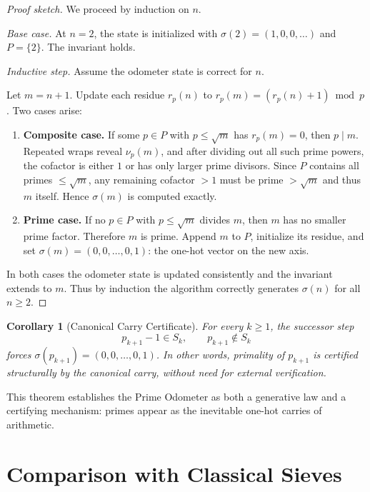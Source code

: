 \documentclass[12pt]{article}
\newtheorem{corollary}[theorem]{Corollary}
\theoremstyle{definition}
\theoremstyle{remark}
\begin{document}
\begin{proof}[Proof sketch]
We proceed by induction on $n$.

\emph{Base case.} At $n=2$, the state is initialized with $\sigma(2)=(1,0,0,\dots)$ and
$P=\{2\}$. The invariant holds.

\emph{Inductive step.} Assume the odometer state is correct for $n$.

Let $m=n+1$. Update each residue $r_p(n)$ to $r_p(m)=(r_p(n)+1)\bmod p$. Two cases arise:

\begin{enumerate}
  \item \textbf{Composite case.} If some $p \in P$ with $p \leq \sqrt{m}$ has $r_p(m)=0$, then
  $p \mid m$. Repeated wraps reveal $\nu_p(m)$, and after dividing out all such prime powers,
  the cofactor is either $1$ or has only larger prime divisors. Since $P$ contains all primes
  $\leq \sqrt{m}$, any remaining cofactor $>1$ must be prime $> \sqrt{m}$ and thus $m$ itself.
  Hence $\sigma(m)$ is computed exactly.

  \item \textbf{Prime case.} If no $p \in P$ with $p \leq \sqrt{m}$ divides $m$, then $m$ has
  no smaller prime factor. Therefore $m$ is prime. Append $m$ to $P$, initialize its residue,
  and set $\sigma(m)=(0,0,\dots,0,1)$: the one-hot vector on the new axis.
\end{enumerate}

In both cases the odometer state is updated consistently and the invariant extends to $m$.
Thus by induction the algorithm correctly generates $\sigma(n)$ for all $n \geq 2$.
\end{proof}

\begin{corollary}[Canonical Carry Certificate]
For every $k \geq 1$, the successor step
\[
p_{k+1}-1 \in S_k, \qquad p_{k+1} \notin S_k
\]
forces $\sigma(p_{k+1})=(0,0,\dots,0,1)$. In other words, primality of $p_{k+1}$ is certified
structurally by the canonical carry, without need for external verification.
\end{corollary}

This theorem establishes the Prime Odometer as both a generative law and a certifying mechanism:
primes appear as the inevitable one-hot carries of arithmetic.

\section{Comparison with Classical Sieves}
\end{document}
